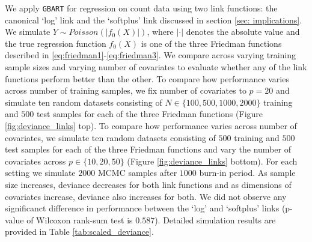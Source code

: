 \documentclass[12pt]{article}
\newcommand{\1}{\mathbb{I}}
\theoremstyle{plain}
\theoremstyle{definition}
\theoremstyle{remark}
\begin{document}
We apply \texttt{GBART} for regression on count data using two link functions: the canonical `log' link and the `softplus' link discussed in section \ref{sec: implications}. We simulate $Y \sim Poisson(|f_0(X)|)$, where $|\cdot|$ denotes the absolute value and the true regression function $f_0(X)$ is one of the three Friedman functions described in \eqref{eq:friedman1}-\eqref{eq:friedman3}. We compare across varying training sample sizes and varying number of covariates to evaluate whether any of the link functions perform better than the other. To compare how performance varies across number of training samples, we fix number of covariates to $p = 20$ and simulate ten random datasets consisting of $N \in \{100, 500, 1000, 2000\}$ training and $500$ test samples for each of the three Friedman functions (Figure \ref{fig:deviance_links} top). To compare how performance varies across number of covariates, we simulate ten random datasets consisting of $500$ training and $500$ test samples for each of the three Friedman functions and vary the number of covariates across $p \in \{10, 20, 50\}$ (Figure \ref{fig:deviance_links} bottom). For each setting we simulate $2000$ MCMC samples after $1000$ burn-in period.
 As sample size increases, deviance decreases for both link functions and as dimensions of covariates increase, deviance also increases for both. We did not observe any significanct difference in performance between the `log' and `softplus' links (p-value of Wilcoxon rank-sum test is $0.587$). Detailed simulation results are provided in Table \ref{tab:scaled_deviance}.
 
\end{document}
